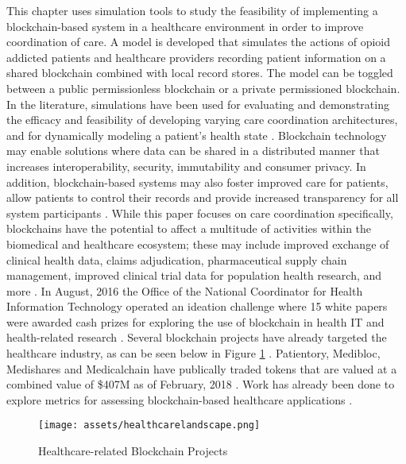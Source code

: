 \documentclass[12pt]{report}
\begin{document}
This chapter uses simulation tools to study the feasibility of implementing a blockchain-based system in a healthcare environment in order to improve coordination of care. A model is developed that simulates the actions of opioid addicted patients and healthcare providers recording patient information on a shared blockchain combined with local record stores. The model can be toggled between a public permissionless blockchain or a private permissioned blockchain. In the literature, simulations have been used for evaluating and demonstrating the efficacy and feasibility of developing varying care coordination architectures, \cite{Zeigler.2014} and for dynamically modeling a patient's health state \cite{CaballeroBarajas.2015}.
\label{sec:exrx}
Blockchain technology may enable solutions where data can be shared in a distributed manner that increases interoperability, security, immutability and consumer privacy. In addition, blockchain-based systems may also foster improved care for patients, allow patients to control their records and provide increased transparency for all system participants \cite{IBMGlobalBusinessServicesPublicSectorTeam.2016}. While this paper focuses on care coordination specifically, blockchains have the potential to affect a multitude of activities within the biomedical and healthcare ecosystem; these may include improved exchange of clinical health data, claims adjudication, pharmaceutical supply chain management, improved clinical trial data for population health research, and more \cite{Rabah.2017,Kuo.2017}. In August, 2016 the Office of the National Coordinator for Health Information Technology operated an ideation challenge where 15 white papers were awarded cash prizes for exploring the use of blockchain in health IT and health-related research \cite{.2192018}. Several blockchain projects have already targeted the healthcare industry, as can be seen below in Figure \ref{fig:landscape} \cite{.healthhub}. Patientory, Medibloc, Medishares and Medicalchain have publically traded tokens that are valued at a combined value of \$407M as of February, 2018 \cite{Coinmarketcap.com.2017}. Work has already been done to explore metrics for assessing blockchain-based healthcare applications \cite{PengZhangMichaelWalkerJulesWhiteDouglasC.Schmidt.2017}.

\begin{figure}[h]
\texttt{[image: assets/healthcarelandscape.png]}
\caption{Healthcare-related Blockchain Projects \cite{.healthhub}}
\label{fig:landscape}
\end{figure}
\end{document}
